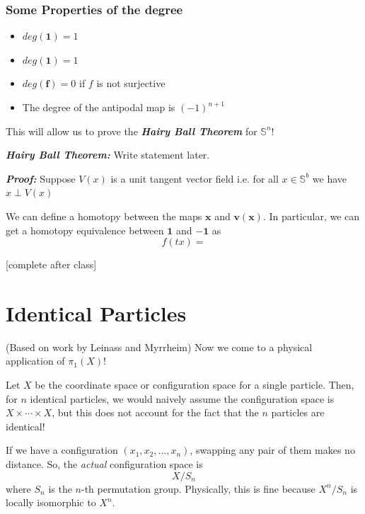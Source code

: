 \documentclass{article}
\begin{document}
\vskip 0.5cm
\subsubsection*{Some Properties of the degree}

\begin{itemize}
  \item $deg(\mathbf{1}) = 1$
  \item $deg(\mathbf{1}) = 1$
  \item $deg(\mathbf{f}) = 0$ if $f$ is not surjective
  \item The degree of the antipodal map is $(-1)^{n+1}$
\end{itemize}

\vskip 0.5cm
This will allow us to prove the \emph{\textbf{Hairy Ball Theorem}} for $\mathbb{S}^n$!

\vskip 0.5cm

\begin{dottedbox}
  \emph{\textbf{Hairy Ball Theorem:}} Write statement later.
\end{dottedbox}

\vskip 0.5cm
\emph{\textbf{Proof:}} Suppose $V(x)$ is a unit tangent vector field i.e. for all $x \in \mathbb{S}^b$ we have $x \perp V(x)$

\vskip 0.25cm
We can define a homotopy between the maps $\mathbf{x}$ and $\mathbf{v(x)}$. In particular, we can get a homotopy equivalence between $\mathbf{1}$ and $\mathbf{-1}$ as
\[ f(tx) =  \]

\vskip 0.5cm
[complete after class]

\vskip 1cm
\section{Identical Particles} (Based on work by Leinass and Myrrheim)
Now we come to a physical application of $\pi_1(X)$! 

\vskip 0.5cm
Let $X$ be the coordinate space or configuration space for a single particle. Then, for $n$ identical particles, we would naively assume the configuration space is $X \times \cdots \times X$, but this does not account for the fact that the $n$ particles are identical! 

\vskip 0.5cm
If we have a configuration $(x_1, x_2, \dots, x_n)$, swapping any pair of them makes no distance. So, the \emph{actual} configuration space is 
\[ X / S_n \]
where $S_n$ is the $n$-th permutation group. Physically, this is fine because $X^n / S_n$ is locally isomorphic to $X^n$.
\end{document}
